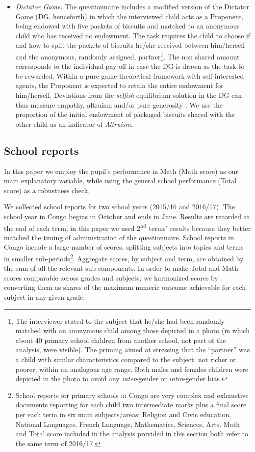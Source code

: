 \documentclass[authoryear, preprint, review, 12pt]{elsarticle}
\begin{document}
\begin{itemize}
\item \textit{Dictator Game}. The questionnaire includes a modified version of the Dictator Game (DG, henceforth) \citep{kahneman1986} in which the interviewed child acts as a Proponent, being endowed with five packets of biscuits and matched to an anonymous child who has received no endowment.
The task requires the child to choose if and how to split the packets of biscuits he/she received between him/herself and the anonymous, randomly assigned, partner\footnote{The interviewer stated to the subject that he/she had been randomly matched with an anonymous child among those depicted in a photo (in which about 40 primary school children from another school, not part of the analysis, were visible). The priming aimed at stressing that the \enquote{partner} was a child with similar characteristics compared to the subject: not richer or poorer, within an analogous age range. Both males and females children were depicted in the photo to avoid any \textit{inter}-gender or \textit{intra}-gender bias.}. The non shared amount corresponds to the individual pay-off in case the DG is drawn as the task to be rewarded. Within a pure game theoretical framework with self-interested agents, the Proponent is expected to retain the entire endowment for him/herself. Deviations from the \emph{selfish} equilibrium solution in the DG can thus measure empathy, altruism and/or pure generosity \citep{forsythe1994,camerer2003,guala2010paradigmatic}. We use the proportion of the initial endowment of packaged biscuits shared with the other child as an indicator of \textit{Altruism}.
\end{itemize}

\subsection{School reports}
\label{sub:schoolreport}
In this paper we employ the pupil's performance in Math (Math score) as our main explanatory variable, while using the general school performance (Total score) as a robustness check.

We collected school reports for two school years (2015/16 and 2016/17). The school year in Congo begins in October and ends in June.  Results are recorded at the end of each term; in this paper we used 2\textsuperscript{nd} terms' results because they better matched the timing of administration of the questionnaire. School reports in Congo include a large number of scores, splitting subjects into topics and terms in smaller sub-periods\footnote{School reports for primary schools in Congo are very complex and exhaustive documents reporting for each child two intermediate marks plus a final score per each term in six main subjects/areas: Religion and Civic education, National Languages, French Language, Mathematics, Sciences, Arts. Math and Total score included in the analysis provided in this section both refer to the same term of 2016/17.}. Aggregate scores, by subject and term, are obtained by the sum of all the relevant sub-components. In order to make Total and Math scores comparable across grades and subjects, we harmonized scores by converting them as shares of the maximum numeric outcome achievable for each subject in any given grade.
\end{document}
